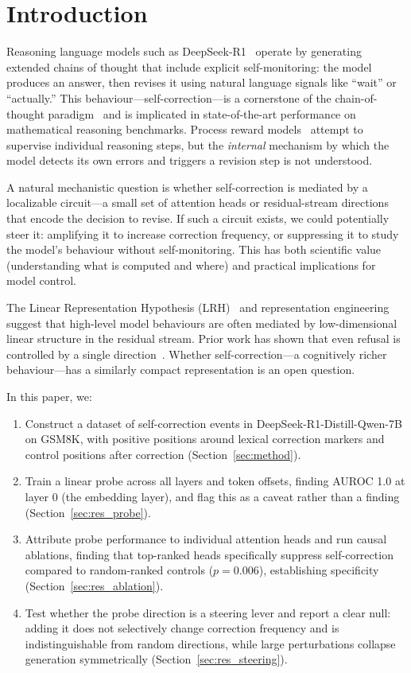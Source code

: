 \documentclass{article}
\begin{document}
\section{Introduction}
\label{sec:intro}

Reasoning language models such as DeepSeek-R1~\citep{deepseek2025r1} operate by generating extended chains of thought that include explicit self-monitoring: the model produces an answer, then revises it using natural language signals like ``wait'' or ``actually.''
This behaviour---self-correction---is a cornerstone of the chain-of-thought paradigm~\citep{wei2022chain} and is implicated in state-of-the-art performance on mathematical reasoning benchmarks.
Process reward models~\citep{lightman2023let} attempt to supervise individual reasoning steps, but the \emph{internal} mechanism by which the model detects its own errors and triggers a revision step is not understood.

A natural mechanistic question is whether self-correction is mediated by a localizable circuit---a small set of attention heads or residual-stream directions that encode the decision to revise.
If such a circuit exists, we could potentially steer it: amplifying it to increase correction frequency, or suppressing it to study the model's behaviour without self-monitoring.
This has both scientific value (understanding what is computed and where) and practical implications for model control.

The Linear Representation Hypothesis (LRH)~\citep{park2024linear} and representation engineering~\citep{zou2023representation} suggest that high-level model behaviours are often mediated by low-dimensional linear structure in the residual stream.
Prior work has shown that even refusal is controlled by a single direction~\citep{arditi2024refusal}.
Whether self-correction---a cognitively richer behaviour---has a similarly compact representation is an open question.

In this paper, we:
\begin{enumerate}
  \item Construct a dataset of self-correction events in DeepSeek-R1-Distill-Qwen-7B on GSM8K, with positive positions around lexical correction markers and control positions after correction (Section~\ref{sec:method}).
  \item Train a linear probe across all layers and token offsets, finding AUROC 1.0 at layer 0 (the embedding layer), and flag this as a caveat rather than a finding (Section~\ref{sec:res_probe}).
  \item Attribute probe performance to individual attention heads and run causal ablations, finding that top-ranked heads specifically suppress self-correction compared to random-ranked controls ($p = 0.006$), establishing specificity (Section~\ref{sec:res_ablation}).
  \item Test whether the probe direction is a steering lever and report a clear null: adding it does not selectively change correction frequency and is indistinguishable from random directions, while large perturbations collapse generation symmetrically (Section~\ref{sec:res_steering}).
\end{enumerate}
\end{document}
